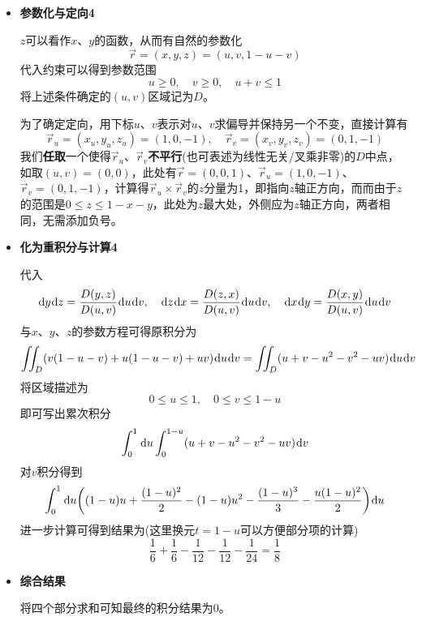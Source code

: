 \documentclass[a4paper,UTF8,fontset=windows,AutoFakeBold]{ctexart}
\newcommand*{\dr}{\hspace{0.07em}\mathrm{d}}
\newcommand*{\rv}{\vec{r}}
\theoremstyle{ex}
\begin{document}
\begin{enumerate}
{\begin{itemize}
            代入
            $$\dr y\dr z=\frac{D(y,z)}{D(u,v)}\dr u\dr v,\quad\dr z\dr x=\frac{D(z,x)}{D(u,v)}\dr u\dr v,\quad\dr x\dr y=\frac{D(x,y)}{D(u,v)}\dr u\dr v$$
            与$x$、$y$、$z$的参数方程可得原积分为
            $$-\iint_Duv\dr u\dr v$$
            可以发现，此积分与分析$S_1$得到的积分形式相同，区域描述也完全相同，由此结果也为$-\frac{1}{24}$。

            \item \textbf{参数化与定向4}
            
            $z$可以看作$x$、$y$的函数，从而有自然的参数化
            $$\vec{r}=(x,y,z)=(u,v,1-u-v)$$
            代入约束可以得到参数范围
            $$u\ge0,\quad v\ge0,\quad u+v\le1$$
            将上述条件确定的$(u,v)$区域记为$D$。

            为了确定定向，用下标$u$、$v$表示对$u$、$v$求偏导并保持另一个不变，直接计算有
            $$\rv_u=(x_u,y_u,z_u)=(1,0,-1),\quad\rv_v=(x_v,y_v,z_v)=(0,1,-1)$$
            我们\textbf{任取}一个使得$\rv_u$、$\rv_v$\textbf{不平行}(也可表述为线性无关/叉乘非零)的$D$中点，如取$(u,v)=(0,0)$，此处有$\rv=(0,0,1)$、$\rv_u=(1,0,-1)$、$\rv_v=(0,1,-1)$，计算得$\rv_u\times\rv_v$的$z$分量为1，即指向$z$轴正方向，而而由于$z$的范围是$0\le z\le1-x-y$，此处为$z$最大处，外侧应为$z$轴正方向，两者相同，无需添加负号。

            \item \textbf{化为重积分与计算4}
            
            代入
            $$\dr y\dr z=\frac{D(y,z)}{D(u,v)}\dr u\dr v,\quad\dr z\dr x=\frac{D(z,x)}{D(u,v)}\dr u\dr v,\quad\dr x\dr y=\frac{D(x,y)}{D(u,v)}\dr u\dr v$$
            与$x$、$y$、$z$的参数方程可得原积分为
            $$\iint_D(v(1-u-v)+u(1-u-v)+uv)\dr u\dr v=\iint_D(u+v-u^2-v^2-uv)\dr u\dr v$$
            将区域描述为
            $$0\le u\le1,\quad 0\le v\le1-u$$
            即可写出累次积分
            $$\int_0^1\dr u\int_0^{1-u}(u+v-u^2-v^2-uv)\dr v$$
            对$v$积分得到
            $$\int_0^1\dr u\bigg((1-u)u+\frac{(1-u)^2}{2}-(1-u)u^2-\frac{(1-u)^3}{3}-\frac{u(1-u)^2}{2}\bigg)\dr u$$
            进一步计算可得到结果为(这里换元$t=1-u$可以方便部分项的计算)
            $$\frac{1}{6}+\frac{1}{6}-\frac{1}{12}-\frac{1}{12}-\frac{1}{24}=\frac{1}{8}$$

            \item \textbf{综合结果}
            
            将四个部分求和可知最终的积分结果为0。
        \end{itemize}
    }


\end{enumerate}
\end{document}
